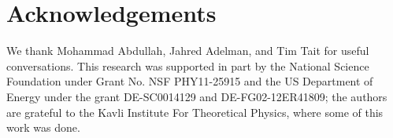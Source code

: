 \section*{Acknowledgements}

We thank Mohammad Abdullah, Jahred Adelman, and Tim Tait for useful conversations. This research was supported in part by the National Science Foundation under Grant No. NSF PHY11-25915 and the US Department of Energy under the grant DE-SC0014129 and DE-FG02-12ER41809; the authors are grateful to the Kavli Institute For Theoretical Physics, where some of this work was done.

%
%


